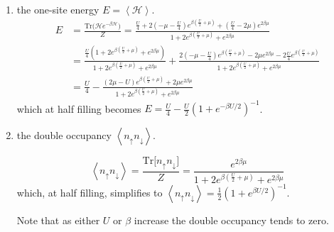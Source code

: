 \begin{enumerate}
\item the one-site energy $E = \left\langle \mathcal{H} \right\rangle$.
\begin{equation}
\begin{split}
E &= \frac{\text{Tr}\bigg( \mathcal{H}e^{-\beta\mathcal{H} } \bigg)}{Z} = \frac{ \frac{U}{4} + 2 ( -\mu - \frac{U}{4} ) e^{\beta(\frac{U}{2} + \mu )} + (\frac{U}{4} - 2\mu ) e^{2\beta\mu}}{1 + 2 e^{\beta (\frac{U}{2} + \mu )} + e^{2\beta\mu} } \\
&= \frac{ \frac{U}{4} ( 1 + 2 e^{\beta (\frac{U}{2} + \mu )} + e^{2\beta\mu} )}{1 + 2 e^{\beta (\frac{U}{2} + \mu )} + e^{2\beta\mu} } + \frac{2(-\mu - \frac{U}{4}) e^{\beta(\frac{U}{2} + \mu)} - 2\mu e^{2\beta\mu} - 2\frac{U}{4} e^{\beta (\frac{U}{2} + \mu)} }{1 + 2 e^{\beta (\frac{U}{2} + \mu )} + e^{2\beta\mu}} \\
&= \frac{U}{4} - \frac{ (2\mu - U) e^{\beta(\frac{U}{2} + \mu) } + 2\mu e^{2\beta\mu} }{1 + 2 e^{\beta (\frac{U}{2} + \mu )} + e^{2\beta\mu} }
\end{split}
\end{equation}
which at half filling becomes
$
E = \frac{U}{4} - \frac{U}{2} ( 1 + e^{-\beta U /2} )^{-1}
$.

\item the double occupancy $\left\langle n_\uparrow n_\downarrow \right\rangle$.

\begin{equation}
\left\langle n_\uparrow n_\downarrow \right\rangle = \frac{\text{Tr} \big[ n_\uparrow n_\downarrow \big]}{Z} = \frac{e^{2\beta\mu}}{1 + 2 e^{\beta (\frac{U}{2} + \mu )} + e^{2\beta\mu}}
\end{equation}
which, at half filling, simplifies to
$
\left\langle n_\uparrow n_\downarrow \right\rangle = \frac{1}{2}  ( 1 + e^{\beta U/2} )^{-1}
$.

Note that as either $U$ or $\beta$ increase the double occupancy tends to zero.
\end{enumerate}

